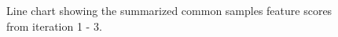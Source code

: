 		\begin{figure}[H]
			\centering
		    \caption{Line chart showing the summarized common samples feature scores from iteration 1  - 3.}
		    \label{fig:common-samples-line}
		\end{figure} 

	


